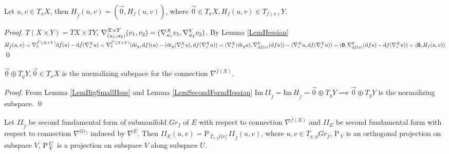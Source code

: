 \documentclass{llncs}
\newcommand{\Proj}{\mathrm{P}{\,}}
\newcommand{\Ima}{\mathrm{Im}{\,}}
\newcommand{\ProjNonOrth}[2]{\tensor*{\Proj}{^{#1}_{#2}}}
\newcommand{\CovariantDiffManif}[1]{\nabla^{#1}}
\newcommand{\CovariantDerivManif}[2]{\tensor*{\nabla}{^{#1}_{#2}}}
\newcommand{\Diff}{\mathrm{d}}
\newcommand {\Preimage}[2]{{#2}^*{#1}}
\begin{document}
\begin{lemma} \label{LemBigSmallHess}
Let $u, v \in T_xX$, 
then $H_{\tilde{f}}(u, v) = (\vec{0}, H_f(u, v))$,
where $\vec{0} \in T_xX, H_f(u, v) \in T_{f(x)}Y$.
\end{lemma}

\begin{proof}
$T(X\times Y)=TX\times TY$, $\CovariantDerivManif{X\times Y}{(u_1, u_2)}{(v_1, v_2)} = (\CovariantDerivManif{X}{u_1}{v_1}, \CovariantDerivManif{Y}{u_2}{v_2})$. 
By Lemma \ref{LemHessian} 
$H_{\tilde{f}}(u, v)=
\CovariantDerivManif{\Preimage{(X \times Y)}{\tilde{f}}} {v} \Diff \tilde{f}(u) - 
							\Diff \tilde{f}( 
							\CovariantDerivManif{X}{v}u
							) =
							\CovariantDerivManif{\Preimage{(X \times Y)}{\tilde{f}}}{v} (\Diff i_y, \Diff f)(u) - 
							(\Diff i_y( 
							\CovariantDerivManif{X}{v}u
							), \Diff f( 
							\CovariantDerivManif{X}{v}u
							)) =
							(\CovariantDerivManif{X}{v} (\Diff i_y u), \CovariantDerivManif{Y}{\Diff f(v)} (\Diff f u)) - 
							(\CovariantDerivManif{X}{v}u, \Diff f( 
							\CovariantDerivManif{X}{v}u)
							) =
							(\vec{0}, \CovariantDerivManif{Y}{\Diff f(v)} (\Diff f u) - \Diff f( 
							\CovariantDerivManif{X}{v}u)) =
							(\vec{0}, H_f(u, v))$
\qed 
\end{proof}

\begin{lemma} \label{LemNormSpace}
$\vec{0}\oplus T_yY, \vec{0} \in T_xX$ is the normalizing subspace for the connection $\CovariantDiffManif{\tilde{f}(X)}$.
\end{lemma}

\begin{proof}
From Lemma \ref{LemBigSmallHess} and Lemma \ref{LemSecondFormHessian} $\Ima II_{\tilde{f}} = 
\Ima H_{\tilde{f}} = \vec{0}\oplus T_yY \implies \vec{0}\oplus T_yY$ is the normalizing subspace.
\qed
\end{proof}

\begin{lemma} \label{LemProj}
Let $II_{\tilde{f}}$ be second fundamental form of submanifold $Gr_f$ of $E$ with respect to connection $\CovariantDiffManif{\tilde{f}(X)}$ and $II_E$ be second fundamental form with respect to connection $\CovariantDiffManif{Gr_f}$ induced by $\CovariantDiffManif{E}$. Then $II_E(u, v) = \Proj_{T_{x, y}Gr_f^{\bot}} II_{\tilde{f}}(u, v)$, where $u, v \in T_{x, y}Gr_f$, $\Proj_V$ is an orthogonal projection on subspace $V$, $\ProjNonOrth{U}{V}$ is a projection on subspace $V$ along subspace $U$.
\end{lemma}
\end{document}
